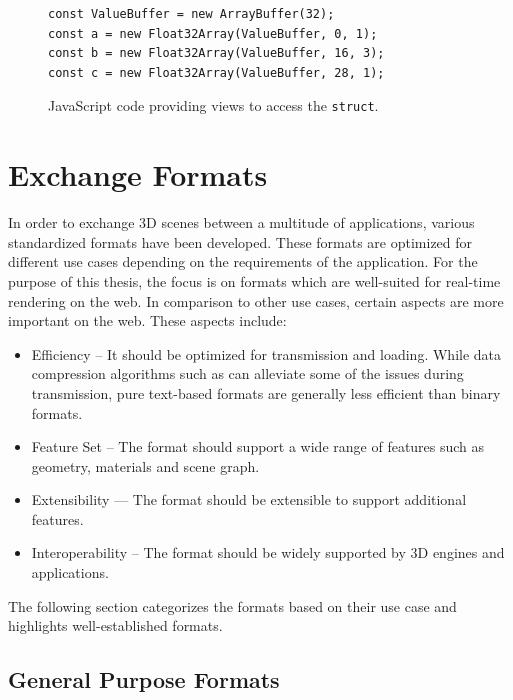 \begin{figure}[H]
  \begin{lstlisting}[style=JavaScript]
const ValueBuffer = new ArrayBuffer(32);
const a = new Float32Array(ValueBuffer, 0, 1);
const b = new Float32Array(ValueBuffer, 16, 3);
const c = new Float32Array(ValueBuffer, 28, 1);
  \end{lstlisting}
  \caption{JavaScript code providing views to access the \texttt{struct}.}
  \label{code:memoryAlignmentJs}
\end{figure}

\section{Exchange Formats}

In order to exchange 3D scenes between a multitude of applications, various standardized formats have been developed. These formats are optimized for different use cases depending on the requirements of the application. For the purpose of this thesis, the focus is on formats which are well-suited for real-time rendering on the web. In comparison to other use cases, certain aspects are more important on the web. These aspects include:

\begin{itemize}
    \item{Efficiency} – It should be optimized for transmission and loading. While data compression algorithms such as  can alleviate some of the issues during transmission, pure text-based formats are generally less efficient than binary formats.
    \item{Feature Set} – The format should support a wide range of features such as geometry, materials and scene graph.
    \item{Extensibility} — The format should be extensible to support additional features.
    \item{Interoperability} – The format should be widely supported by 3D engines and applications.
\end{itemize}

The following section categorizes the formats based on their use case and highlights well-established formats.

\subsection*{General Purpose Formats}

